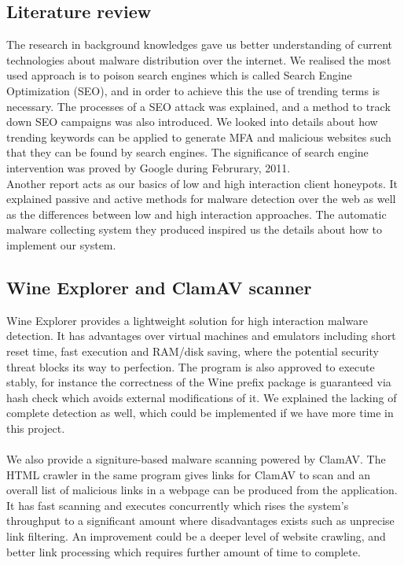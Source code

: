 \subsection{Literature review}
The research in background knowledges gave us better understanding of current 
technologies about malware distribution over the internet. We realised the 
most used approach is to poison search engines which is called Search Engine 
Optimization (SEO), and in order to achieve this the use of trending terms 
is necessary. The processes of a SEO attack was explained, and a method to 
track down SEO campaigns was also introduced. We looked into details about 
how trending keywords can be applied to generate MFA and malicious websites 
such that they can be found by search engines. The significance of search 
engine intervention was proved by Google during Februrary, 2011. \\
Another report acts as our basics of low and high interaction client 
honeypots. It explained passive and active methods for malware detection 
over the web as well as the differences between low and high interaction 
approaches. The automatic malware collecting system they produced inspired 
us the details about how to implement our system. 

\subsection{Wine Explorer and ClamAV scanner}
Wine Explorer provides a lightweight solution for high interaction malware 
detection. It has advantages over virtual machines and emulators including 
short reset time, fast execution and RAM/disk saving, where the potential 
security threat blocks its way to perfection. The program is also approved to 
execute stably, for instance the correctness of the Wine prefix package is 
guaranteed via hash check which avoids external modifications of it. We 
explained the lacking of complete detection as well, which could be 
implemented if we have more time in this project. 
\paragraph{}
We also provide a signiture-based malware scanning powered by ClamAV. The 
HTML crawler in the same program gives links for ClamAV to scan and an 
overall list of malicious links in a webpage can be produced from the 
application. It has fast scanning and executes concurrently which rises 
the system's throughput to a significant amount where disadvantages exists 
such as unprecise link filtering. An improvement could be a deeper level of 
website crawling, and better link processing which requires further amount 
of time to complete. 

